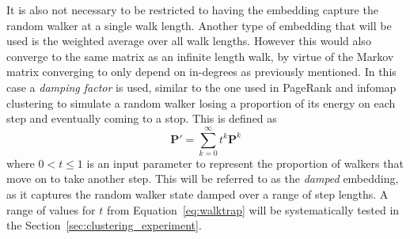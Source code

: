 It is also not necessary to be restricted to having the embedding capture the random walker at a single walk length. Another type of embedding that will be used is the weighted average over all walk lengths. However this would also converge to the same matrix as an infinite length walk, by virtue of the Markov matrix converging to only depend on in-degrees as previously mentioned. In this case a \emph{damping factor} is used, similar to the one used in PageRank \cite{Page1999} and infomap clustering \cite{Rosvall2008} to simulate a random walker losing a proportion of its energy on each step and eventually coming to a stop. This is defined as
\begin{equation}
  \mathbf{P}' = \sum_{k=0}^\infty t^k\mathbf{P}^{k}
  \label{eq:damped}
\end{equation}
where $0<t\leq 1$ is an input parameter to represent the proportion of walkers that move on to take another step. This will be referred to as the \emph{damped} embedding, as it captures the random walker state damped over a range of step lengths. A range of values for $t$ from Equation~\eqref{eq:walktrap} will be systematically tested in the Section~\ref{sec:clustering_experiment}.

